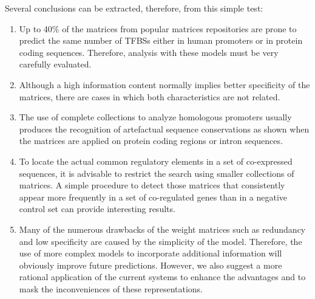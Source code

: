 Several conclusions can be extracted, therefore, from this simple test:
\begin{enumerate}
\item
Up to 40\% of the matrices from popular matrices repositories are prone to predict the same 
number of TFBSs either in human promoters or in protein coding sequences. Therefore, analysis 
with these models must be very carefully evaluated.
\item
Although a high information content normally implies better specificity of the matrices, 
there are cases in which both characteristics are not related.
\item
The use of complete collections to analyze homologous promoters usually produces the
recognition of artefactual sequence conservations as shown when the matrices are
applied on protein coding regions or intron sequences.
\item
To locate the actual common regulatory elements in a set of co-expressed sequences, it is
advisable to restrict the search using smaller collections of matrices. A simple procedure
to detect those matrices that consistently appear more frequently in a set of co-regulated
genes than in a negative control set can provide interesting results.
\item
Many of the numerous drawbacks of the weight matrices such as redundancy and low specificity
are caused by the simplicity of the model. Therefore, the use of more complex models to incorporate
additional information will obviously improve future predictions. However, we also suggest a more
rational application of the current systems to enhance the advantages and to mask the inconveniences
of these representations.
\end{enumerate}


